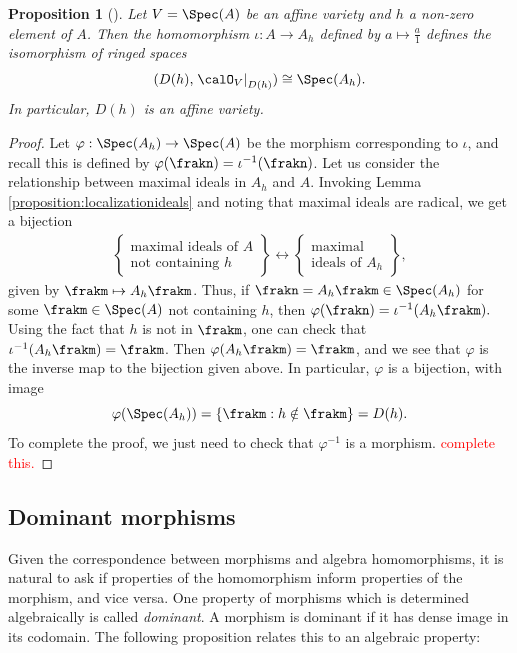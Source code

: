 \documentclass[12pt]{amsart}
\theoremstyle{plain}
\newtheorem{proposition}[theorem]{Proposition}
\begin{document}
\begin{proposition}[{\cite[Proposition 3.32]{Milne13}}]\label{proposition:localisationembedding}
Let $V = \Spec(A)$ be an affine variety and $h$ a non-zero element of $A$.
Then the homomorphism $\iota : A \to A_h$ defined by $a \mapsto \frac{a}{1}$ defines the isomorphism of ringed spaces
$$(D(h), \left. \calO_V \right|_{D(h)}) \cong \Spec(A_h).$$
In particular, $D(h)$ is an affine variety.
\end{proposition}
\begin{proof}
Let $\varphi : \Spec(A_h) \to \Spec(A)$ be the morphism corresponding to $\iota$, and recall this is defined by $\varphi(\frakn) = \iota^{-1}(\frakn)$.
Let us consider the relationship between maximal ideals in $A_h$ and $A$.
Invoking Lemma \ref{proposition:localizationideals} and noting that maximal ideals are radical, we get a bijection
\begin{align*}
\left\{
\begin{array}{c}
	\text{maximal ideals of } A \\
	\text{not containing } h
\end{array}
\right\} \longleftrightarrow 
\left\{
\begin{array}{c}
	\text{maximal} \\
	\text{ideals of } A_h 
\end{array}
\right\},
\end{align*}
given by $\frakm \mapsto A_h \frakm$.
Thus, if $\frakn = A_h \frakm \in \Spec(A_h)$ for some $\frakm \in \Spec(A)$ not containing $h$, then $\varphi(\frakn) = \iota^{-1}(A_h \frakm).$
Using the fact that $h$ is not in $\frakm$, one can check that $\iota^{-1}(A_h \frakm) = \frakm$.
Then $\varphi(A_h \frakm) = \frakm$, and we see that $\varphi$ is the inverse map to the bijection given above.
In particular, $\varphi$ is a bijection, with image
$$\varphi(\Spec(A_h)) = \{\frakm : h \notin \frakm\} = D(h).$$
To complete the proof, we just need to check that $\varphi^{-1}$ is a morphism.
\textcolor{red}{complete this.}
\end{proof}




\subsection{Dominant morphisms}
Given the correspondence between morphisms and algebra homomorphisms, it is natural to ask if properties of the homomorphism inform properties of the morphism, and vice versa.
One property of morphisms which is determined algebraically is called \emph{dominant}.
A morphism is dominant if it has dense image in its codomain.
The following proposition relates this to an algebraic property:
\end{document}
